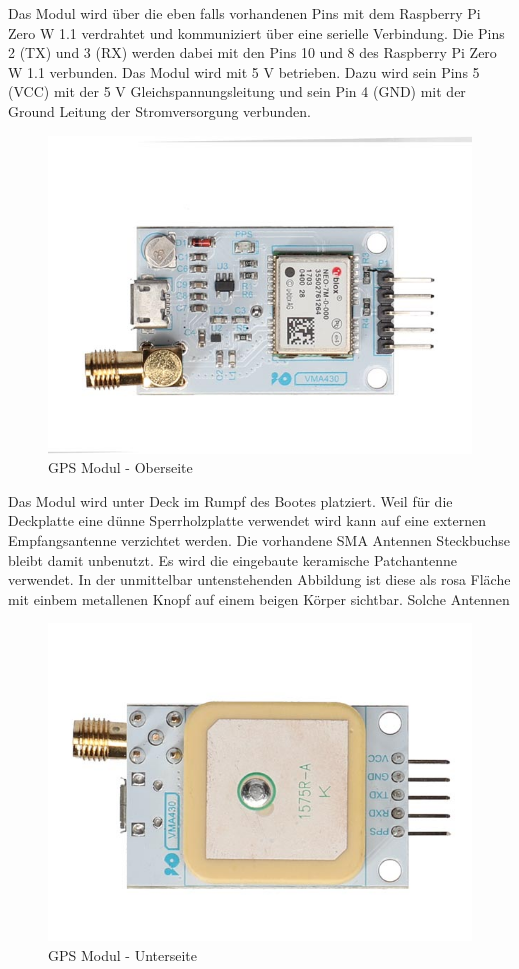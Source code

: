 Das Modul wird über die eben falls vorhandenen Pins mit dem Raspberry Pi Zero W 1.1 verdrahtet und  kommuniziert über eine serielle Verbindung. Die Pins 2 (TX) und 3 (RX) werden dabei mit den Pins 10 und 8 des Raspberry Pi Zero W 1.1 verbunden. Das Modul wird mit 5 V betrieben. Dazu wird sein Pins 5 (VCC) mit der 5 V Gleichspannungsleitung und sein Pin 4 (GND) mit der Ground Leitung der Stromversorgung verbunden.   
\begin{figure}[H]
    \centering
    \includegraphics[width=0.75\linewidth]{vma430_front-1.jpg}
    \caption{GPS Modul - Oberseite}
    \label{fig:enter-label}
\end{figure}
Das Modul wird unter Deck im Rumpf des Bootes platziert. Weil für die Deckplatte eine dünne Sperrholzplatte verwendet wird kann auf eine externen Empfangsantenne verzichtet werden. Die vorhandene SMA Antennen Steckbuchse bleibt damit unbenutzt. Es wird die eingebaute keramische Patchantenne verwendet. In der unmittelbar untenstehenden Abbildung ist diese als rosa Fläche mit einbem metallenen Knopf auf einem beigen Körper sichtbar. Solche Antennen 
\begin{figure}[H]
    \centering
    \includegraphics[width=0.75\linewidth]{vma430_back-1.jpg}
    \caption{GPS Modul - Unterseite}
    \label{fig:enter-label}
\end{figure}

